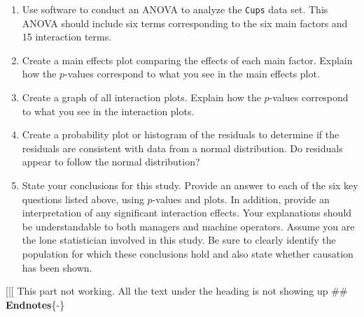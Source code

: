 \documentclass[
]{report}
\begin{document}
\begin{list}{E.}{ \setlength{\itemsep}{1.2em}}
  \begin{enumerate}
    \item Use software to conduct an ANOVA to analyze the \texttt{Cups} data set. This ANOVA should include six terms corresponding to the six main factors and 15 interaction terms.
    \item Create a main effects plot comparing the effects of each main factor. Explain how the $p$-values correspond to what you see in the main effects plot.
    \item Create a graph of all interaction plots. Explain how the $p$-values correspond to what you see in the interaction plots.
    \item Create a probability plot or histogram of the residuals to determine if the residuals are consistent with data from a normal distribution. Do residuals appear to follow the normal distribution?
    \item State your conclusions for this study. Provide an answer to each of the six key questions listed above, using $p$-values and plots. In addition, provide an interpretation of any significant interaction effects. Your explanations should be understandable to both managers and machine operators. Assume you are the lone statistician involved in this study. Be sure to clearly identify the population for which these conclusions hold and also state whether causation has been shown.
  \end{enumerate}
  
\end{list}

{[}{[}{[} This part not working. All the text under the heading is not showing up
\#\# \textbf{Endnotes}\{-\}
\end{document}
